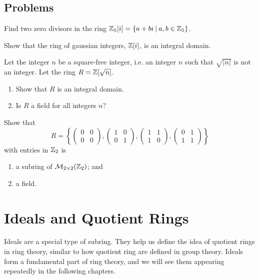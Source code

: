 \newpage
\section{Problems}
\begin{problem}
    Find two zero divisors in the ring $\Zn{5}[i] = \{a+bi\vert a,b \in \Zn{5}\}$.
\end{problem}

\begin{problem}
    Show that the ring of gaussian integers, $\mathbb{Z}[i]$, is an integral domain.
\end{problem}

\begin{problem}
    Let the integer $n$ be a square-free integer, i.e. an integer $n$ such that $\sqrt{|n|}$ is not an integer. Let the ring $R = \mathbb{Z}[\sqrt{n}]$.
    \begin{enumerate}[label=(\alph*)]
        \item Show that $R$ is an integral domain.
        \item Is $R$ a field for all integers $n$?
    \end{enumerate}
\end{problem}

\begin{problem}
    Show that
    \[
        R = \left\{\begin{pmatrix}0&0\\0&0\end{pmatrix},\begin{pmatrix}1&0\\0&1\end{pmatrix},\begin{pmatrix}1&1\\1&0\end{pmatrix},\begin{pmatrix}0&1\\1&1\end{pmatrix}\right\}
    \]
    with entries in $\mathbb{Z}_{2}$ is
    \begin{enumerate}[label=(\roman*)]
        \item a subring of $\mathcal{M}_{2\times2}(\mathbb{Z}_{2})$; and
        \item a field.
    \end{enumerate}
\end{problem}

\chapter{Ideals and Quotient Rings}
Ideals are a special type of subring. They help us define the idea of quotient rings in ring theory, similar to how quotient ring are defined in group theory. Ideals form a fundamental part of ring theory, and we will see them appearing repeatedly in the following chapters.

